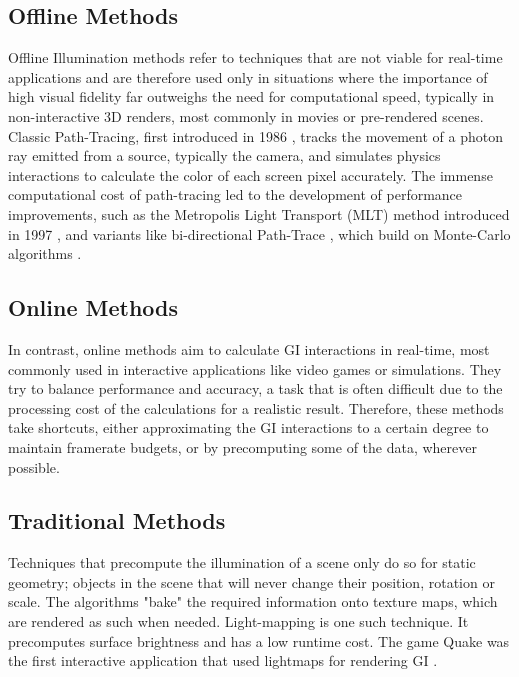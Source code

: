 \subsection{Offline Methods}
\label{sec:offline}
Offline Illumination methods refer to techniques that are not viable for real-time applications and are therefore used only in situations where the importance of high visual fidelity far outweighs the need for computational speed, typically in non-interactive 3D renders, most commonly in movies or pre-rendered scenes. Classic Path-Tracing, first introduced in 1986 \parencite{Kajiya1986}, tracks the movement of a photon ray emitted from a source, typically the camera, and simulates physics interactions to calculate the color of each screen pixel accurately. The immense computational cost of path-tracing led to the development of performance improvements, such as the Metropolis Light Transport (MLT) method introduced in 1997 \parencite{Veach1997}, and variants like bi-directional Path-Trace \parencite{Lafortune1993}, which build on Monte-Carlo algorithms \parencite{Lafortune1996}.

\subsection{Online Methods} %
In contrast, online methods aim to calculate GI interactions in real-time, most commonly used in interactive applications like video games or simulations. They try to balance performance and accuracy, a task that is often difficult due to the processing cost of the calculations for a realistic result. Therefore, these methods take shortcuts, either approximating the GI interactions to a certain degree to maintain framerate budgets, or by precomputing some of the data, wherever possible.

\subsection*{Traditional Methods} %
Techniques that precompute the illumination of a scene only do so for static geometry; objects in the scene that will never change their position, rotation or scale. The algorithms "bake" the required information onto texture maps, which are rendered as such when needed. Light-mapping is one such technique. It precomputes surface brightness and has a low runtime cost. The game Quake was the first interactive application that used lightmaps for rendering GI \parencite{WikiLightmaps}.

